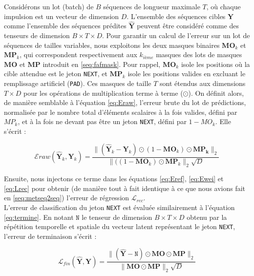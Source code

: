 Considérons un lot (batch) de $B$ séquences de longueur maximale $T$, où chaque impulsion est un vecteur de dimension $D$. L'ensemble des séquences cibles $\mathbf{Y}$ comme l'ensemble des séquences prédites $\hat{\mathbf{Y}}$ peuvent être considéré comme des tenseurs de dimension $B \times T \times D$. Pour garantir un calcul de l'erreur sur un lot de séquences de tailles variables, nous exploitons les deux masques binaires $\mathbf{MO}_k$ et $\mathbf{MP}_k$, qui correspondent respectivement aux $k_{ième}$ masques des lots de masques $\mathbf{MO}$ et $\mathbf{MP}$ introduit en \ref{seq:fafmask}. Pour rappel, $\mathbf{MO}_k$ isole les positions où la cible attendue est le jeton \texttt{NEXT}, et $\mathbf{MP}_k$ isole les positions valides en excluant le remplissage artificiel (\texttt{PAD}). Ces masques de taille $T$ sont étendus aux dimensions $T \times D$ pour les opérations de multiplication terme à terme ($\odot$). On définit alors, de manière semblable à l'équation \eqref{eq:Eraw}, l'erreur brute du lot de prédictions, normalisée par le nombre total d'éléments scalaires à la fois valides, défini par $MP_k$, et à la fois ne devant pas être un jeton \texttt{NEXT}, défini par $1 - MO_k$. Elle s'écrit :

\begin{equation}
\mathcal{E}{raw}(\hat{\mathbf{Y}}_k, \mathbf{Y}_k) = \frac{\| (\hat{\mathbf{Y}}_k - \mathbf{Y}_k) \odot (1 - \mathbf{MO}_k) \odot \mathbf{MP_k} \|_2}{\| ((1 - \mathbf{MO}_k) \odot \mathbf{MP}_k \|_2\sqrt{D}}
\end{equation}

Ensuite, nous injectons ce terme dans les équations \eqref{eq:Eref}, \eqref{eq:Ewei} et \eqref{eq:Lrec} pour obtenir (de manière tout à fait identique à ce que nous avions fait en \ref{seq:metseq2seq}) l'erreur de régression $\mathcal{L}_{rec}$.\\

L'erreur de classification du jeton \texttt{NEXT} est évaluée similairement à l'équation \eqref{eq:termine}. En notant $\texttt{N}$ le tenseur de dimension $B \times T \times D$ obtenu par la répétition temporelle et spatiale du vecteur latent représentant le jeton \texttt{NEXT}, l'erreur de terminaison s'écrit :

\begin{equation}
\mathcal{L}_{fin}(\hat{\mathbf{Y}}, \mathbf{Y}) = \frac{\|(\hat{\mathbf{Y}} - \texttt{N}) \odot \mathbf{MO} \odot \mathbf{MP} \|_2}{\| \mathbf{MO} \odot \mathbf{MP} \|_2\sqrt{D}}
\end{equation}

